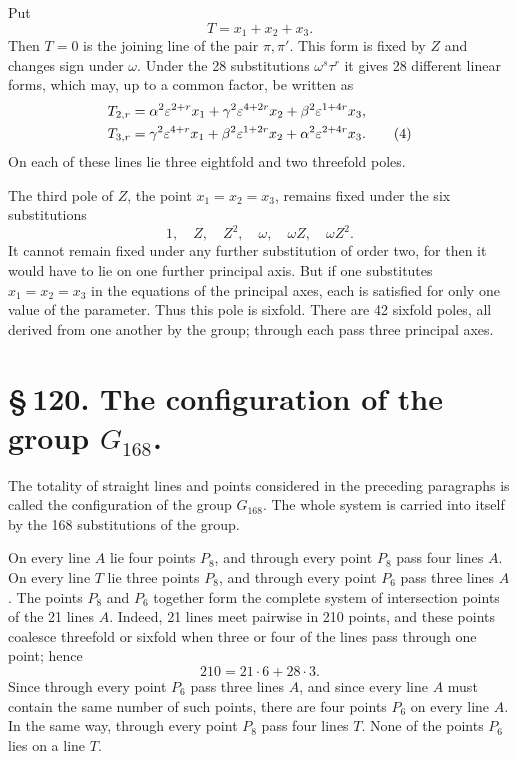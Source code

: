 \documentclass[11pt]{article}
\newcommand{\eps}{\varepsilon}
\begin{document}
Put
\begin{equation}
T=x_1+x_2+x_3.
\tag{3}
\end{equation}
Then \(T=0\) is the joining line of the pair \(\pi,\pi'\). This form is fixed by \(Z\) and changes sign under \(\omega\). Under the 28 substitutions \(\omega^s\tau^r\) it gives 28 different linear forms, which may, up to a common factor, be written as
\begin{align}
T_{2,r}&=\alpha^2\eps^{2+r}x_1+\gamma^2\eps^{4+2r}x_2+\beta^2\eps^{1+4r}x_3,\notag\\
T_{3,r}&=\gamma^2\eps^{4+r}x_1+\beta^2\eps^{1+2r}x_2+\alpha^2\eps^{2+4r}x_3.
\tag{4}
\end{align}
On each of these lines lie three eightfold and two threefold poles.

The third pole of \(Z\), the point \(x_1=x_2=x_3\), remains fixed under the six substitutions
\begin{equation}
1,\quad Z,\quad Z^2,\quad \omega,\quad \omega Z,\quad \omega Z^2.
\tag{5}
\end{equation}
It cannot remain fixed under any further substitution of order two, for then it would have to lie on one further principal axis. But if one substitutes \(x_1=x_2=x_3\) in the equations of the principal axes, each is satisfied for only one value of the parameter. Thus this pole is sixfold. There are 42 sixfold poles, all derived from one another by the group; through each pass three principal axes.

\section*{\S\,120. The configuration of the group \(G_{168}\).}

The totality of straight lines and points considered in the preceding paragraphs is called the configuration of the group \(G_{168}\). The whole system is carried into itself by the 168 substitutions of the group.

On every line \(A\) lie four points \(P_8\), and through every point \(P_8\) pass four lines \(A\). On every line \(T\) lie three points \(P_8\), and through every point \(P_6\) pass three lines \(A\). The points \(P_8\) and \(P_6\) together form the complete system of intersection points of the 21 lines \(A\). Indeed, 21 lines meet pairwise in 210 points, and these points coalesce threefold or sixfold when three or four of the lines pass through one point; hence
\begin{equation}
210=21\cdot6+28\cdot3.
\tag{1}
\end{equation}
Since through every point \(P_6\) pass three lines \(A\), and since every line \(A\) must contain the same number of such points, there are four points \(P_6\) on every line \(A\). In the same way, through every point \(P_8\) pass four lines \(T\). None of the points \(P_6\) lies on a line \(T\).
\end{document}
